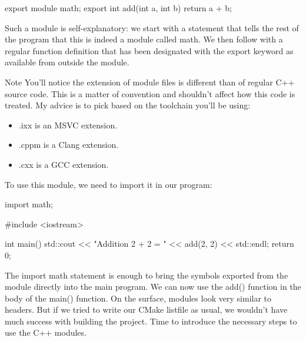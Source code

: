 
\begin{cpp}
export module math;
export int add(int a, int b) {
    return a + b;
}
\end{cpp}

Such a module is self-explanatory: we start with a statement that tells the rest of the program that this is indeed a module called math. We then follow with a regular function definition that has been designated with the export keyword as available from outside the module.

\begin{myNotic}{Note}
You’ll notice the extension of module files is different than of regular C++ source code. This is a matter of convention and shouldn’t affect how this code is treated. My advice is to pick based on the toolchain you’ll be using:

\begin{itemize}
\item
.ixx is an MSVC extension.

\item
.cppm is a Clang extension.

\item
.cxx is a GCC extension.
\end{itemize}
\end{myNotic}

To use this module, we need to import it in our program:


\begin{cpp}
import math;

#include <iostream>

int main() {
    std::cout << "Addition 2 + 2 = " << add(2, 2) << std::endl;
    return 0;
}
\end{cpp}

The import math statement is enough to bring the symbols exported from the module directly into the main program. We can now use the add() function in the body of the main() function. On the surface, modules look very similar to headers. But if we tried to write our CMake listfile as usual, we wouldn’t have much success with building the project. Time to introduce the necessary steps to use the C++ modules.









